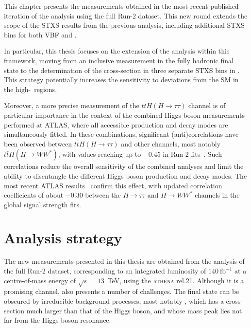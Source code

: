 This chapter presents the measurements obtained in the most recent published iteration of the \htautau analysis using the full Run-2 dataset. This new round extends the scope of the STXS results from the previous analysis, including additional STXS bins for both VBF and \ttH.  

In particular, this thesis focuses on the extension of the \ttH analysis within this framework, moving from an inclusive measurement in the fully hadronic final state to the determination of the cross-section in three separate STXS bins in \pth. This strategy potentially increases the sensitivity to deviations from the SM in the high-\pt\ regions.  

Moreover, a more precise measurement of the $t\bar{t}H(H\to\tau\tau)$ channel is of particular importance in the context of the combined Higgs boson measurements performed at ATLAS, where all accessible production and decay modes are simultaneously fitted. In these combinations, significant (anti)correlations have been observed between $t\bar{t}H(H\to\tau\tau)$ and other channels, most notably $t\bar{t}H(H\to WW^*)$, with values reaching up to $-0.45$ in Run-2 fits~\cite{Aad_2020_combined}. Such correlations reduce the overall sensitivity of the combined analyses and limit the ability to disentangle the different Higgs boson production and decay modes. The most recent ATLAS results~\cite{ATLAS-CONF-2025-006} confirm this effect, with updated correlation coefficients of about $-0.30$ between the $H\to\tau\tau$ and $H\to WW^*$ channels in the global signal strength fits.


\section{Analysis strategy}
\label{sec:analysis_strategy}

The new measurements presented in this thesis are obtained from the analysis of the full Run-2 dataset, corresponding to an integrated luminosity of $140~\text{fb}^{-1}$ at a centre-of-mass energy of $\sqrt{s}=13$~TeV, using the \textsc{athena} rel.21. Although it is a promising channel, \htautau also presents a number of challenges. The final state can be obscured by irreducible background processes, most notably \ztautau, which has a cross-section much larger than that of the Higgs boson, and whose mass peak lies not far from the Higgs boson resonance.  

